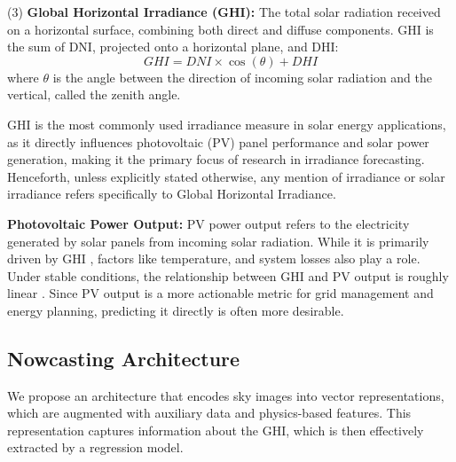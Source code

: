 (3) \textbf{Global Horizontal Irradiance (GHI):} The total solar radiation received on a horizontal surface, combining both direct and diffuse components. GHI is the sum of DNI, projected onto a horizontal plane, and DHI:  
\begin{equation}
    GHI = DNI \times \cos(\theta) + DHI
\end{equation}  
where \( \theta \) is the angle between the direction of incoming solar radiation and the vertical, called the zenith angle.

GHI is the most commonly used irradiance measure in solar energy applications, as it directly influences photovoltaic (PV) panel performance and solar power generation, making it the primary focus of research in irradiance forecasting. Henceforth, unless explicitly stated otherwise, any mention of irradiance or solar irradiance
refers specifically to Global Horizontal Irradiance.


\textbf{Photovoltaic Power Output:}
PV power output refers to the electricity generated by solar panels from incoming solar radiation. While it is primarily driven by GHI \cite{ghi_pv_linear}, factors like temperature, and system losses also play a role. Under stable conditions, the relationship between GHI and PV output is roughly linear \cite{pv_output, pv_output2}. Since PV output is a more actionable metric for grid management and energy planning, predicting it directly is often more desirable.


\subsection{Nowcasting Architecture}
\label{subsec:nowcasting_architecture}
We propose an architecture that encodes sky images into vector representations, which are augmented with auxiliary data and physics-based features. This representation captures information about the GHI, which is then effectively extracted by a regression model.


